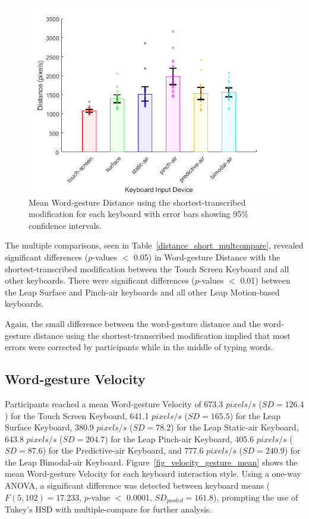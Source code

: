 \begin{figure}[!t]
	\centering
	\includegraphics{Figures/fig_distance_short_mean}
	\caption[Mean Word-gesture Distance for Modified-shortest]{Mean Word-gesture Distance using the shortest-transcribed modification for each keyboard with error bars showing 95\% confidence intervals.}
	\label{fig_distance_short_mean}
\end{figure}

The multiple comparisons, seen in Table~\ref{distance_short_multcompare}, revealed significant differences ($p$-values $<$ 0.05) in Word-gesture Distance with the shortest-transcribed modification between the Touch Screen Keyboard and all other keyboards. There were significant differences ($p$-values $<$ 0.01) between the Leap Surface and Pinch-air keyboards and all other Leap Motion-based keyboards.

Again, the small difference between the word-gesture distance and the word-gesture distance using the shortest-transcribed modification implied that most errors were corrected by participants while in the middle of typing words.

\subsection{Word-gesture Velocity} \label{results_velocity_gesture}
Participants reached a mean Word-gesture Velocity of 673.3 $pixels/s$ ($SD = 126.4$) for the Touch Screen Keyboard, 641.1 $pixels/s$ ($SD = 165.5$) for the Leap Surface Keyboard, 380.9 $pixels/s$ ($SD = 78.2$) for the Leap Static-air Keyboard, 643.8 $pixels/s$ ($SD = 204.7$) for the Leap Pinch-air Keyboard, 405.6 $pixels/s$ ($SD = 87.6$) for the Predictive-air Keyboard, and 777.6 $pixels/s$ ($SD = 240.9$) for the Leap Bimodal-air Keyboard. Figure~\ref{fig_velocity_gesture_mean} shows the mean Word-gesture Velocity for each keyboard interaction style. Using a one-way ANOVA, a significant difference was detected between keyboard means ($F(5, 102) = 17.233$, $p$-value $<$ 0.0001, $SD_{pooled} = 161.8$), prompting the use of Tukey's HSD with multiple-compare for further analysis.

